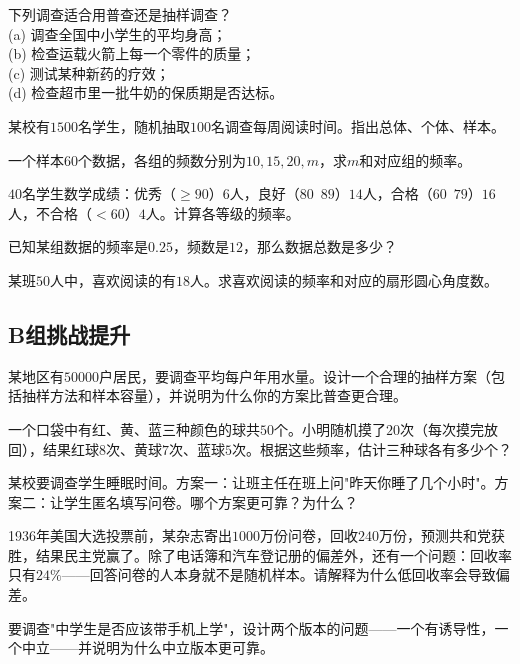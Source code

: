 \begin{exercise}
\item 下列调查适合用普查还是抽样调查？\\
(a) 调查全国中小学生的平均身高；\\
(b) 检查运载火箭上每一个零件的质量；\\
(c) 测试某种新药的疗效；\\
(d) 检查超市里一批牛奶的保质期是否达标。
\item 某校有$1500$名学生，随机抽取$100$名调查每周阅读时间。指出总体、个体、样本。
\item 一个样本$60$个数据，各组的频数分别为$10,15,20,m$，求$m$和对应组的频率。
\item $40$名学生数学成绩：优秀（$\ge90$）$6$人，良好（$80$~$89$）$14$人，合格（$60$~$79$）$16$人，不合格（$<60$）$4$人。计算各等级的频率。
\item 已知某组数据的频率是$0.25$，频数是$12$，那么数据总数是多少？
\item 某班$50$人中，喜欢阅读的有$18$人。求喜欢阅读的频率和对应的扇形圆心角度数。
\end{exercise}

\subsection*{B组\quad 挑战提升}

\begin{exercise}
\item 某地区有$50000$户居民，要调查平均每户年用水量。设计一个合理的抽样方案（包括抽样方法和样本容量），并说明为什么你的方案比普查更合理。
\item 一个口袋中有红、黄、蓝三种颜色的球共$50$个。小明随机摸了$20$次（每次摸完放回），结果红球$8$次、黄球$7$次、蓝球$5$次。根据这些频率，估计三种球各有多少个？
\item 某校要调查学生睡眠时间。方案一：让班主任在班上问"昨天你睡了几个小时"。方案二：让学生匿名填写问卷。哪个方案更可靠？为什么？
\item 1936年美国大选投票前，某杂志寄出$1000$万份问卷，回收$240$万份，预测共和党获胜，结果民主党赢了。除了电话簿和汽车登记册的偏差外，还有一个问题：回收率只有$24\%$——回答问卷的人本身就不是随机样本。请解释为什么低回收率会导致偏差。
\item 要调查"中学生是否应该带手机上学"，设计两个版本的问题——一个有诱导性，一个中立——并说明为什么中立版本更可靠。
\end{exercise}

\newpage
